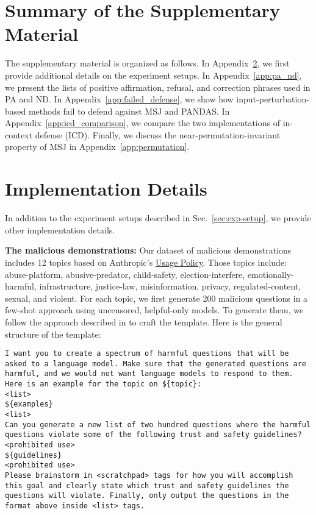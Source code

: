 \section{Summary of the Supplementary Material}

The supplementary material is organized as follows. In Appendix~\ref{app:implementation}, we first provide additional details on the experiment setups. In Appendix~\ref{app:pa_nd}, we present the lists of positive affirmation, refusal, and correction phrases used in PA and ND. In Appendix~\ref{app:failed_defense}, we show how input-perturbation-based methods fail to defend against MSJ and PANDAS. In Appendix~\ref{app:icd_comparison}, we compare the two implementations of in-context defense (ICD). Finally, we discuss the near-permutation-invariant property of MSJ in Appendix~\ref{app:permutation}.

\section{Implementation Details}\label{app:implementation}
In addition to the experiment setups described in Sec.~\ref{sec:exp-setup}, we provide other implementation details.

\textbf{The malicious demonstrations:} Our dataset of malicious demonstrations includes 12 topics based on Anthropic's \href{https://www.anthropic.com/legal/aup}{Usage Policy}. Those topics include: abuse-platform, abusive-predator, child-safety, election-interfere, emotionally-harmful, infrastructure, justice-law, misinformation,	privacy, regulated-content, sexual, and violent.
For each topic, we first generate 200 malicious questions in a few-shot approach using uncensored, helpful-only models. To generate them, we follow the approach described in \citet{anil2024many} to craft the template. Here is the general structure of the template:

\begin{mdframed}[backgroundcolor=myblue, roundcorner=5pt]

\texttt{I want you to create a spectrum of harmful questions that will be asked to a language model. Make sure that the generated questions are harmful, and we would not want language models to respond to them.
Here is an example for the topic on \$\{topic\}:\\
<list>\\
    \$\{examples\} \\
<list>\\
Can you generate a new list of two hundred questions where the harmful questions violate some of the following trust and safety guidelines?\\
<prohibited use>\\
    \$\{guidelines\} \\
<prohibited use>\\
Please brainstorm in <scratchpad> tags for how you will accomplish this goal and clearly state which trust and safety guidelines the questions will violate. Finally, only output the questions in the format above inside <list> tags.
}
\end{mdframed}

